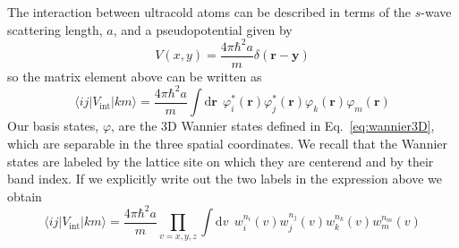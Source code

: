 \documentclass[11pt,letter]{article}
\newcommand{\bv}[1]{\ensuremath{\bm{#1}}}
\begin{document}
The interaction between ultracold atoms can be described in terms of the
$s$-wave scattering length, $a$,  and a pseudopotential given
by~\cite{Bloch2008}
\begin{equation}
    V(x,y) = \frac{ 4 \pi \hbar^{2} a } { m } \delta(\bv{r}-\bv{y}) 
\end{equation}
so the matrix element above can be written as 
\begin{equation}
    \langle ij | V_{\mathrm{int}} | km \rangle =
\frac{ 4 \pi \hbar^{2} a } { m }
    \int \mathrm{d}\bv{r}  \ \  \varphi_{i}^{*}(\bv{r}) \varphi_{j}^{*}(\bv{r}) \varphi_{k}(\bv{r}) \varphi_{m}(\bv{r}) 
\end{equation}
Our basis states, $\varphi$, are the 3D Wannier states defined in
Eq.~\ref{eq:wannier3D}, which are separable in the three spatial coordinates.
We recall that the Wannier states are labeled by the lattice site on which they
are centerend and by their band index.   If we explicitly write out the two
labels in the expression above we obtain
\begin{equation}
    \langle ij | V_{\mathrm{int}} | km \rangle =
\frac{ 4 \pi \hbar^{2} a } { m }
  \prod_{v=x,y,z}
    \int \mathrm{d}v  \ \ 
    w_{i}^{n_{i}}(v) w_{j}^{n_{j}}(v) w_{k}^{n_{k}}(v) w_{m}^{n_{m}}(v)
\end{equation}
\end{document}

